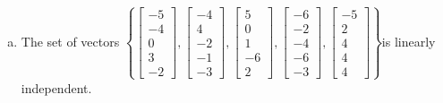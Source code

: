 \begin{exerciseAnswer}
\begin{enumerate}[(a)]
\item  The set of vectors \( \left\{ \left[\begin{array}{c}
-5 \\
-4 \\
0 \\
3 \\
-2
\end{array}\right] , \left[\begin{array}{c}
-4 \\
4 \\
-2 \\
-1 \\
-3
\end{array}\right] , \left[\begin{array}{c}
5 \\
0 \\
1 \\
-6 \\
2
\end{array}\right] , \left[\begin{array}{c}
-6 \\
-2 \\
-4 \\
-6 \\
-3
\end{array}\right] , \left[\begin{array}{c}
-5 \\
2 \\
4 \\
4 \\
4
\end{array}\right] \right\} \)is linearly independent.
\end{enumerate}
    
\end{exerciseAnswer}
    
